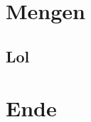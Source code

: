 %
%
%
%



\renewcommand\daynr{1}




\maketitle
\begin{frame}

\end{frame}
\begin{frame}

\end{frame}
\begin{frame}

\end{frame}
\section{Mengen}
\subsection{Lol}
\begin{frame}

\end{frame}
\begin{frame}

\end{frame}
\begin{frame}

\end{frame}

\section{Ende}


